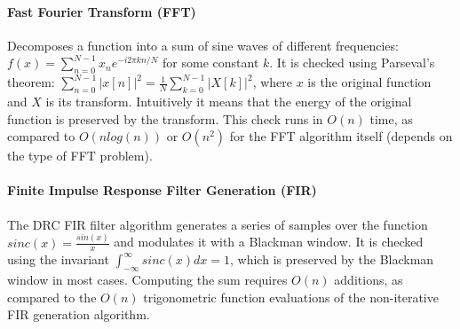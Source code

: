 \documentclass[10pt, conference, compsocconf]{IEEEtran}
\begin{document}
\paragraph{Fast Fourier Transform (FFT)}
Decomposes a function into a sum of sine waves of different frequencies: $f(x) = \sum_{n=0}^{N-1} x_n e^{-i2\pi k n / N}$ for some constant $k$.
It is checked using Parseval's theorem: $\sum_{n=0}^{N-1} \left| x[n] \right|^2 = \frac{1}{N} \sum_{k=0}^{N-1} \left| X[k] \right|^2$, where $x$ is the original function and $X$ is its transform.
Intuitively it means that the energy of the original function is preserved by the transform.
This check runs in $O(n)$ time, as compared to $O(n log(n))$ or $O(n^2)$ for the FFT algorithm itself (depends on the type of FFT problem).

\paragraph{Finite Impulse Response Filter Generation (FIR)}
The DRC FIR filter algorithm generates a series of samples over the function $sinc(x)=\frac{sin(x)}{x}$
and modulates it with a Blackman window.
It is checked using the invariant $\int_{-\infty}^{\infty} sinc(x)dx = 1$, which is preserved by the Blackman window in most cases.
Computing the sum requires $O(n)$ additions, as compared to the $O(n)$ trigonometric function evaluations of the non-iterative FIR generation algorithm.

\end{document}
